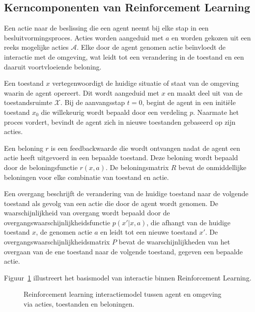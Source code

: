 \documentclass[a4paper,12pt]{article}
\begin{document}
\subsection{Kerncomponenten van Reinforcement Learning}
Een actie naar de beslissing die een agent neemt bij elke stap in een
besluitvormingsproces. Acties worden aangeduid met \( a \) en worden gekozen
uit een reeks mogelijke acties \( \mathcal{A} \). Elke door de agent genomen
actie beïnvloedt de interactie met de omgeving, wat leidt tot een verandering
in de toestand en een daaruit voortvloeiende beloning.

Een toestand \( x \) vertegenwoordigt de huidige situatie of staat van de
omgeving waarin de agent opereert. Dit wordt aangeduid met \( x \) en maakt
deel uit van de toestandsruimte \( \mathcal{X} \). Bij de aanvangsstap \( t = 0
\), begint de agent in een initiële toestand \( x_0 \) die willekeurig wordt
bepaald door een verdeling \( p \). Naarmate het proces vordert, bevindt de
agent zich in nieuwe toestanden gebaseerd op zijn acties.

Een beloning \( r \) is een feedbackwaarde die wordt ontvangen nadat de agent
een actie heeft uitgevoerd in een bepaalde toestand. Deze beloning wordt
bepaald door de beloningsfunctie \( r(x, a) \). De beloningsmatrix \( R \)
bevat de onmiddellijke beloningen voor elke combinatie van toestand en actie.

Een overgang beschrijft de verandering van de huidige toestand naar de volgende
toestand als gevolg van een actie die door de agent wordt genomen. De
waarschijnlijkheid van overgang wordt bepaald door de
overgangswaarschijnlijkheidsfunctie \( p(x'|x, a) \), die afhangt van de
huidige toestand \( x \), de genomen actie \( a \) en leidt tot een nieuwe
toestand \( x' \). De overgangswaarschijnlijkheidsmatrix \( P \) bevat de
waarschijnlijkheden van het overgaan van de ene toestand naar de volgende
toestand, gegeven een bepaalde actie.

Figuur~\ref{fig:rl_model} illustreert het basismodel van interactie binnen
Reinforcement Learning.
\begin{figure}[h]
    \caption{Reinforcement learning interactiemodel tussen agent en omgeving via acties, toestanden en beloningen.}
    \label{fig:rl_model}
\end{figure}
\end{document}
